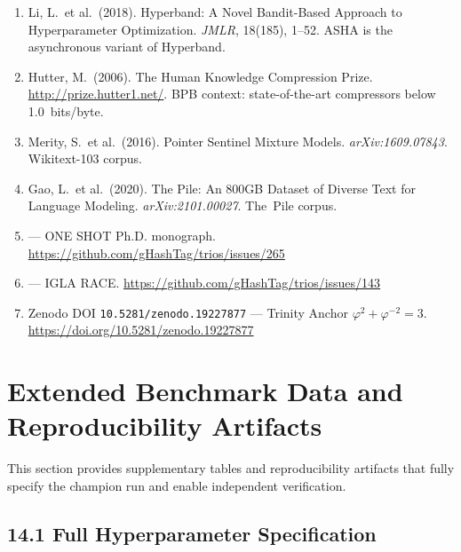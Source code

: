 \begin{enumerate}
\item Li, L.\ et al.\ (2018). Hyperband: A Novel Bandit-Based Approach
  to Hyperparameter Optimization.  \emph{JMLR}, 18(185), 1--52.
  \label{ref:li2018hyperband}
  ASHA is the asynchronous variant of Hyperband.

\item Hutter, M.\ (2006). The Human Knowledge Compression Prize.
  \url{http://prize.hutter1.net/}.
  BPB context: state-of-the-art compressors below 1.0~bits/byte.

\item Merity, S.\ et al.\ (2016). Pointer Sentinel Mixture Models.
  \emph{arXiv:1609.07843}.  Wikitext-103 corpus.
  \label{ref:merity_wikitext_2016}

\item Gao, L.\ et al.\ (2020). The Pile: An 800GB Dataset of Diverse
  Text for Language Modeling.  \emph{arXiv:2101.00027}.
  The~Pile corpus.
  \label{ref:gao_pile_2020}

\item {} ---
  ONE SHOT Ph.D. monograph.
  \url{https://github.com/gHashTag/trios/issues/265}

\item {} ---
  IGLA RACE.
  \url{https://github.com/gHashTag/trios/issues/143}

\item Zenodo DOI \texttt{10.5281/zenodo.19227877} ---
  Trinity Anchor $\varphi^2 + \varphi^{-2} = 3$.
  \url{https://doi.org/10.5281/zenodo.19227877}
\end{enumerate}


\section{Extended Benchmark Data and Reproducibility Artifacts}
\label{sec:ch25-extended-data}

This section provides supplementary tables and reproducibility
artifacts that fully specify the champion run and enable
independent verification.

\subsection{14.1 Full Hyperparameter Specification}
\label{subsec:ch25-full-hyperparams}

